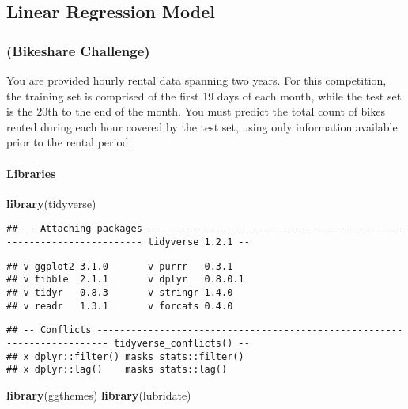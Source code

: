 \documentclass[]{article}
\title{}
\author{}
\date{}
\newenvironment{Shaded}{\begin{snugshade}}{\end{snugshade}}
\newcommand{\KeywordTok}[1]{\textcolor[rgb]{0.13,0.29,0.53}{\textbf{#1}}}
\newcommand{\NormalTok}[1]{#1}
\let\oldparagraph\paragraph
\renewcommand{\paragraph}[1]{\oldparagraph{#1}\mbox{}}
\begin{document}
\subsection{Linear Regression Model}\label{linear-regression-model}

\subsubsection{(Bikeshare Challenge)}\label{bikeshare-challenge}

You are provided hourly rental data spanning two years. For this
competition, the training set is comprised of the first 19 days of each
month, while the test set is the 20th to the end of the month. You must
predict the total count of bikes rented during each hour covered by the
test set, using only information available prior to the rental period.

\paragraph{Libraries}\label{libraries}

\begin{Shaded}
\begin{Highlighting}[]
\KeywordTok{library}\NormalTok{(tidyverse)}
\end{Highlighting}
\end{Shaded}

\begin{verbatim}
## -- Attaching packages --------------------------------------------------------------------- tidyverse 1.2.1 --
\end{verbatim}

\begin{verbatim}
## v ggplot2 3.1.0       v purrr   0.3.1  
## v tibble  2.1.1       v dplyr   0.8.0.1
## v tidyr   0.8.3       v stringr 1.4.0  
## v readr   1.3.1       v forcats 0.4.0
\end{verbatim}

\begin{verbatim}
## -- Conflicts ------------------------------------------------------------------------ tidyverse_conflicts() --
## x dplyr::filter() masks stats::filter()
## x dplyr::lag()    masks stats::lag()
\end{verbatim}

\begin{Shaded}
\begin{Highlighting}[]
\KeywordTok{library}\NormalTok{(ggthemes)}
\KeywordTok{library}\NormalTok{(lubridate)}
\end{Highlighting}
\end{Shaded}
\end{document}
